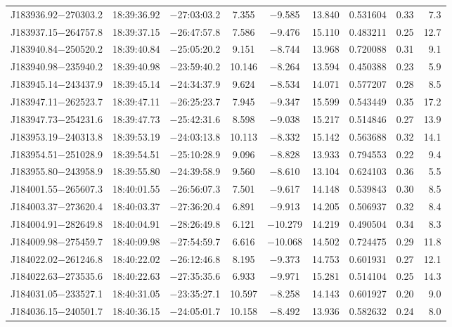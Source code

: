 \begin{table*}
\begin{tabular}{lcccccccr}
J183936.92$-$270303.2 & 18:39:36.92 & $-$27:03:03.2 &  7.355 & $-$9.585 & 13.840 & 0.531604 & 0.33 & 7.3 \\
J183937.15$-$264757.8 & 18:39:37.15 & $-$26:47:57.8 &  7.586 & $-$9.476 & 15.110 & 0.483211 & 0.25 & 12.7 \\
J183940.84$-$250520.2 & 18:39:40.84 & $-$25:05:20.2 &  9.151 & $-$8.744 & 13.968 & 0.720088 & 0.31 & 9.1 \\
J183940.98$-$235940.2 & 18:39:40.98 & $-$23:59:40.2 & 10.146 & $-$8.264 & 13.594 & 0.450388 & 0.23 & 5.9 \\
J183945.14$-$243437.9 & 18:39:45.14 & $-$24:34:37.9 &  9.624 & $-$8.534 & 14.071 & 0.577207 & 0.28 & 8.5 \\
J183947.11$-$262523.7 & 18:39:47.11 & $-$26:25:23.7 &  7.945 & $-$9.347 & 15.599 & 0.543449 & 0.35 & 17.2 \\
J183947.73$-$254231.6 & 18:39:47.73 & $-$25:42:31.6 &  8.598 & $-$9.038 & 15.217 & 0.514846 & 0.27 & 13.9 \\
J183953.19$-$240313.8 & 18:39:53.19 & $-$24:03:13.8 & 10.113 & $-$8.332 & 15.142 & 0.563688 & 0.32 & 14.1 \\
J183954.51$-$251028.9 & 18:39:54.51 & $-$25:10:28.9 &  9.096 & $-$8.828 & 13.933 & 0.794553 & 0.22 & 9.4 \\
J183955.80$-$243958.9 & 18:39:55.80 & $-$24:39:58.9 &  9.560 & $-$8.610 & 13.104 & 0.624103 & 0.36 & 5.5 \\
J184001.55$-$265607.3 & 18:40:01.55 & $-$26:56:07.3 &  7.501 & $-$9.617 & 14.148 & 0.539843 & 0.30 & 8.5 \\
J184003.37$-$273620.4 & 18:40:03.37 & $-$27:36:20.4 &  6.891 & $-$9.913 & 14.205 & 0.506937 & 0.32 & 8.4 \\
J184004.91$-$282649.8 & 18:40:04.91 & $-$28:26:49.8 &  6.121 & $-$10.279 & 14.219 & 0.490504 & 0.34 & 8.3 \\
J184009.98$-$275459.7 & 18:40:09.98 & $-$27:54:59.7 &  6.616 & $-$10.068 & 14.502 & 0.724475 & 0.29 & 11.8 \\
J184022.02$-$261246.8 & 18:40:22.02 & $-$26:12:46.8 &  8.195 & $-$9.373 & 14.753 & 0.601931 & 0.27 & 12.1 \\
J184022.63$-$273535.6 & 18:40:22.63 & $-$27:35:35.6 &  6.933 & $-$9.971 & 15.281 & 0.514104 & 0.25 & 14.3 \\
J184031.05$-$233527.1 & 18:40:31.05 & $-$23:35:27.1 & 10.597 & $-$8.258 & 14.143 & 0.601927 & 0.20 & 9.0 \\
J184036.15$-$240501.7 & 18:40:36.15 & $-$24:05:01.7 & 10.158 & $-$8.492 & 13.936 & 0.582632 & 0.24 & 8.0 \\

\end{tabular}
\end{table*}
